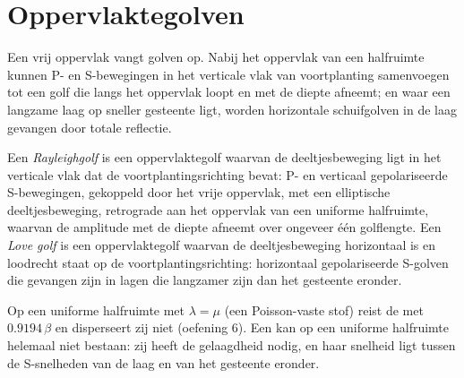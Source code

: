 \section{Oppervlaktegolven}

Een vrij oppervlak vangt golven op. Nabij het oppervlak van een halfruimte kunnen P- en S-bewegingen
in het verticale vlak van voortplanting samenvoegen tot een golf die langs
het oppervlak loopt en met de diepte afneemt; en waar een langzame laag op sneller gesteente ligt,
worden horizontale schuifgolven in de laag gevangen door totale reflectie.

\begin{definition}\label{def:b3:seismology-imaging:surface-waves}
Een \emph{Rayleighgolf} is een oppervlaktegolf waarvan de deeltjesbeweging
ligt in het verticale vlak dat de voortplantingsrichting bevat:
P- en verticaal gepolariseerde S-bewegingen, gekoppeld door het vrije oppervlak, met een
elliptische deeltjesbeweging, retrograde aan het oppervlak van een uniforme halfruimte,
waarvan de amplitude met de diepte afneemt over ongeveer één golflengte. Een \emph{Love
golf} is een oppervlaktegolf waarvan de deeltjesbeweging horizontaal is
en loodrecht staat op de voortplantingsrichting: horizontaal gepolariseerde S-golven die
gevangen zijn in lagen die langzamer zijn dan het gesteente eronder.
\end{definition}

Op een uniforme halfruimte met $\lambda = \mu$ (een Poisson-vaste stof) reist de
 met $0.9194\,\beta$ en disperseert zij niet (oefening 6). Een 
kan op een uniforme halfruimte helemaal niet bestaan: zij heeft de gelaagdheid nodig, en haar
snelheid ligt tussen de S-snelheden van de laag en van het gesteente eronder.


